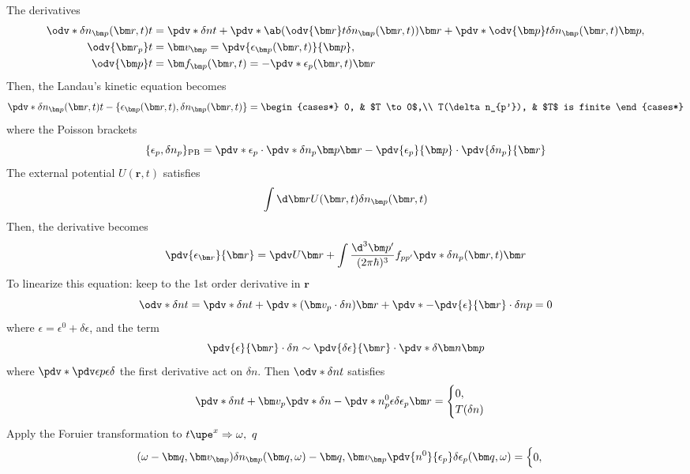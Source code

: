 The derivatives
\begin{align*}
  \odv*{\delta n_{\bm p}(\bm r,t)}t &
= \pdv*{\delta n}t + \pdv*{\ab(\odv{\bm r}t \delta n_{\bm p} (\bm r,t))}{\bm r}
+ \pdv*{\odv{\bm p}t \delta n_{\bm p}(\bm r, t)}{\bm p},\\
  \odv{\bm r_p}t & = \bm v_{\bm p} = \pdv{\epsilon_{\bm p}(\bm r, t)}{\bm p},\\
  \odv{\bm p}t & = \bm f_{\bm p}(\bm r, t)
= -\pdv*{\epsilon_p (\bm r, t)}{\bm r}
\end{align*}
Then, the Landau's kinetic equation becomes
\begin{equation}
  \pdv*{\delta n_{\bm p}(\bm r, t)}t
- \{\epsilon_{\bm p}(\bm r,t), \delta n_{\bm p}(\bm r,t)\} =
  \begin{cases*}
    0, & $T \to 0$,\\
    T(\delta n_{p'}), & $T$ is finite
  \end{cases*}
\end{equation}
where the Poisson brackets
\[
  \{\epsilon_p, \delta n_p\}_\text{PB}
= \pdv*{\epsilon_p \cdot \pdv*{\delta n_p}{\bm p}}{\bm r}
- \pdv{\epsilon_p}{\bm p} \cdot \pdv{\delta n_p}{\bm r}
\]
The external potential $U(\bm r, t)$ satisfies
\[
  \int \d\bm r U(\bm r, t) \delta n_{\bm p}(\bm r, t)
\]
Then, the derivative becomes
\[
  \pdv{\epsilon_{\bm r}}{\bm r} = \pdv U{\bm r}
+ \int \frac{\d^3\bm p'}{(2\pi\hbar)^3} f_{pp'} \pdv*{\delta n_p(\bm r, t)}{\bm r}
\]
To linearize this equation: keep to the 1st order derivative in $\bm r$
\[
  \odv*{\delta n}t = \pdv*{\delta n}t + \pdv*{(\bm v_p \cdot \delta n)}{\bm r}
                   + \pdv*{-\pdv{\epsilon}{\bm r} \cdot \delta n}p = 0
\]
where $\epsilon = \epsilon^0 + \delta \epsilon$, and the term
\[
  \pdv{\epsilon}{\bm r} \cdot \delta n \sim
  \pdv{\delta\epsilon}{\bm r} \cdot \pdv*{\delta\bm n}{\bm p}
\]
where $\pdv*{\pdv\epsilon p}\epsilon \delta$ the first derivative act on $\delta n$.
Then $\odv*{\delta n}t$ satisfies
\[
  \pdv*{\delta n}t + \bm v_p \pdv*{\delta n - \pdv*{n_p^0}\epsilon \delta \epsilon_p}{\bm r}
= \begin{cases}
  0,\\T(\delta n)
\end{cases}
\]
Apply the Foruier transformation to $t\upe^x \Rightarrow \omega,\ q$
\[
  (\omega - \bm q, \bm v_{\bm p}) \delta n_{\bm p}(\bm q, \omega) -
  \bm q, \bm v_{\bm p} \pdv{n^0}{\epsilon_p} \delta \epsilon_p (\bm q, \omega)
= \begin{cases}
  0, \\
  \end{cases}
\]
